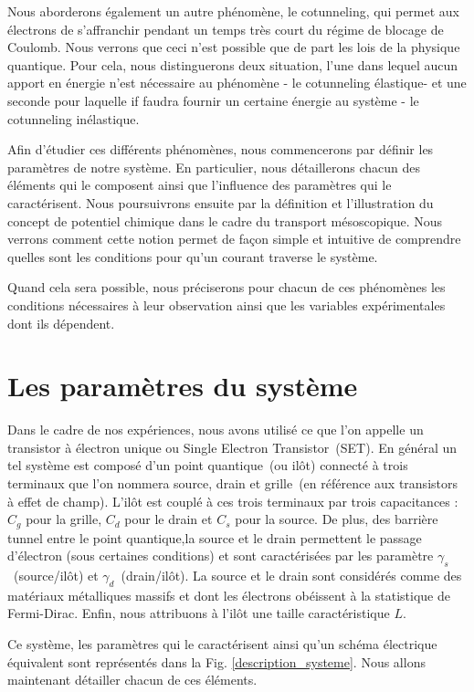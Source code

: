 Nous aborderons également un autre phénomène, le cotunneling, qui permet aux électrons de s'affranchir pendant un temps très court du régime de blocage de Coulomb. Nous verrons que ceci n'est possible que de part les lois de la physique quantique. Pour cela, nous distinguerons deux situation, l'une dans lequel aucun apport en énergie n'est nécessaire au phénomène - le cotunneling élastique- et une seconde pour laquelle if faudra fournir un certaine énergie au système - le cotunneling inélastique.

Afin d'étudier ces différents phénomènes, nous commencerons par définir les paramètres de notre système. En particulier, nous détaillerons chacun des éléments qui le composent ainsi que l'influence des paramètres qui le caractérisent. Nous poursuivrons ensuite par la définition et l'illustration du concept de potentiel chimique dans le cadre du transport mésoscopique. Nous verrons comment cette notion permet de façon simple et intuitive de comprendre quelles sont les conditions pour qu'un courant traverse le système.

Quand cela sera possible, nous préciserons pour chacun de ces phénomènes les conditions nécessaires à leur observation ainsi que les variables expérimentales dont ils dépendent.


\section{Les paramètres du système}
Dans le cadre de nos expériences, nous avons utilisé ce que l'on appelle un transistor à électron unique ou Single Electron Transistor~(SET). En général un tel système est composé d'un point quantique~(ou ilôt) connecté à trois terminaux que l'on nommera source, drain et grille~(en référence aux transistors à effet de champ). L'il\^ot est couplé à ces trois terminaux par trois capacitances : $C_g$ pour la grille, $C_d$ pour le drain et $C_s$ pour la source. De plus, des barrière tunnel entre le point quantique,la source et le drain permettent le passage d'électron (sous certaines conditions) et sont caractérisées par les paramètre $\gamma_s$~(source/il\^ot) et $\gamma_d$~(drain/il\^ot). La source et le drain sont considérés comme des matériaux métalliques massifs et dont les électrons obéissent à la statistique de Fermi-Dirac. Enfin, nous attribuons à l'il\^ot une taille caractéristique $L$. 

Ce système, les paramètres qui le caractérisent ainsi qu'un schéma électrique équivalent sont représentés dans la Fig. \ref{description_systeme}. Nous allons maintenant détailler chacun de ces éléments.


